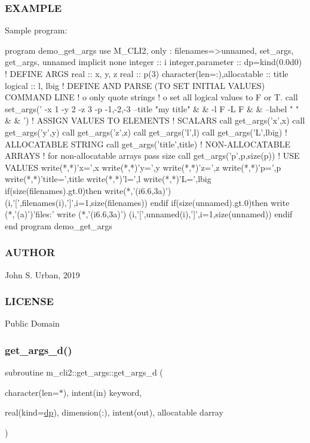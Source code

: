  \subsubsection*{E\+X\+A\+M\+P\+LE}

Sample program\+: \begin{DoxyVerb}program demo_get_args
use M_CLI2,  only : filenames=>unnamed, set_args, get_args, unnamed
implicit none
integer                      :: i
integer,parameter            :: dp=kind(0.0d0)
! DEFINE ARGS
real                         :: x, y, z
real                         :: p(3)
character(len=:),allocatable :: title
logical                      :: l, lbig
! DEFINE AND PARSE (TO SET INITIAL VALUES) COMMAND LINE
!   o only quote strings
!   o set all logical values to F or T.
call set_args(' -x 1 -y 2 -z 3 -p -1,-2,-3 --title "my title" &
        & -l F -L F  &
        & --label " " &
        & ')
! ASSIGN VALUES TO ELEMENTS
! SCALARS
call get_args('x',x)
call get_args('y',y)
call get_args('z',z)
call get_args('l',l)
call get_args('L',lbig)
! ALLOCATABLE STRING
call get_args('title',title)
! NON-ALLOCATABLE ARRAYS
! for non-allocatable arrays pass size
call get_args('p',p,size(p))
! USE VALUES
write(*,*)'x=',x
write(*,*)'y=',y
write(*,*)'z=',z
write(*,*)'p=',p
write(*,*)'title=',title
write(*,*)'l=',l
write(*,*)'L=',lbig
if(size(filenames).gt.0)then
   write(*,'(i6.6,3a)')(i,'[',filenames(i),']',i=1,size(filenames))
endif
if(size(unnamed).gt.0)then
   write (*,'(a)')'files:'
   write (*,'(i6.6,3a)') (i,'[',unnamed(i),']',i=1,size(unnamed))
endif
end program demo_get_args
\end{DoxyVerb}
 \subsubsection*{A\+U\+T\+H\+OR}

John S. Urban, 2019 \subsubsection*{L\+I\+C\+E\+N\+SE}

Public Domain \mbox{\label{interfacem__cli2_1_1get__args_a4508f384dc3ea5ad71f7e8b5cbdb1f25}} 
\subsubsection{\texorpdfstring{get\+\_\+args\+\_\+d()}{get\_args\_d()}}
{\footnotesize\ttfamily subroutine m\+\_\+cli2\+::get\+\_\+args\+::get\+\_\+args\+\_\+d (\begin{DoxyParamCaption}\item[{character(len=$\ast$), intent(in)}]{keyword,  }\item[{real(kind=\mbox{\hyperlink{namespacem__cli2_acf83f1963cf6a56ad0221cfcf5402440}{dp}}), dimension(\+:), intent(out), allocatable}]{darray }\end{DoxyParamCaption})\hspace{0.3cm}{\ttfamily [private]}}

